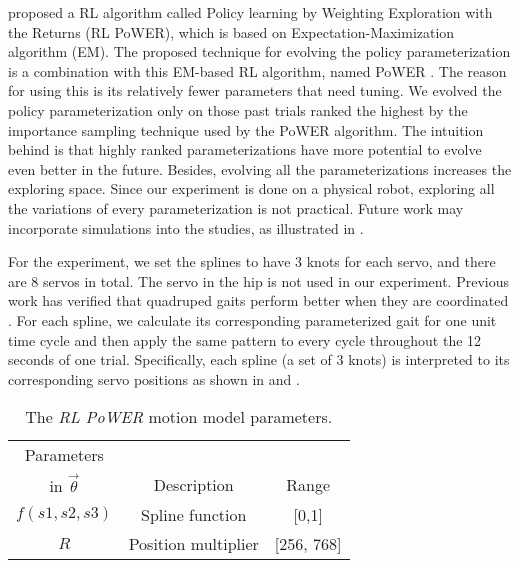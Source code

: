 \cite{kober2009learning-motor-primitives} proposed a RL algorithm
called Policy learning by Weighting Exploration with the
Returns (RL PoWER), which is based on Expectation-Maximization algorithm
(EM). The proposed technique for evolving the policy parameterization
is a combination with this EM-based RL algorithm, named PoWER \cite{kober2009learning-motor-primitives}.  The reason for using this is its relatively fewer parameters that need tuning. We
evolved the policy parameterization only on those past trials ranked
the highest by the importance sampling technique used by the PoWER
algorithm. The intuition behind is that highly ranked
parameterizations have more potential to evolve even better in the
future. Besides, evolving all the parameterizations increases the exploring space. Since our experiment
is done on a physical robot, exploring all the variations of every
parameterization is not practical. Future work may incorporate simulations into the studies, as illustrated in \cite{bongard2006resilient-machines-through}.

For the experiment, we set the splines to have 3 knots for each servo, and there are 8
servos in total. The servo in the hip is not used in
our experiment. Previous work has verified that quadruped gaits
perform better when they are coordinated \citep{clune2009evolving-coordinated-quadruped, clune2011on-the-performance-of-indirect-encoding, valsalam2008modular-neuroevolution-for-multilegged}. For each spline, we calculate its corresponding parameterized gait for one unit time cycle  and then apply the same
pattern to every cycle throughout the 12 seconds of one
trial. Specifically, each spline (a set of 3 knots) is interpreted to its corresponding servo positions as shown in  and .

\begin{table}[h]
\begin{center}
\begin{tabular}{|c|c|c|}
\hline
Parameters        &                           &       \\
in $\vec{\theta}$ & Description               & Range \\
\hline
\hline
$f(s1,s2,s3)$        & Spline function           & [0,1] \\  %
\hline
$R$          & Position multiplier                & [256, 768] \\
\hline
\end{tabular}
\caption{The \emph{RL PoWER} motion model parameters.}
\end{center}
\end{table}


